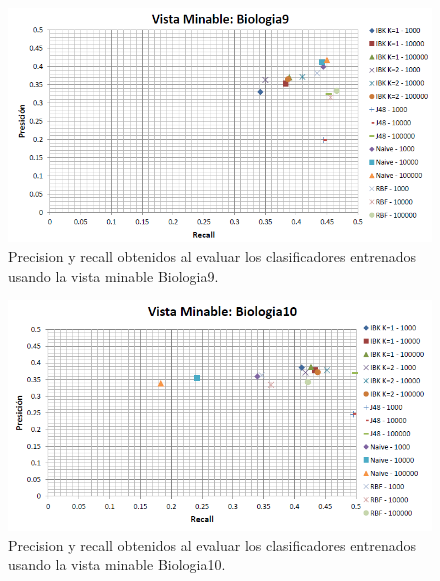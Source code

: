 \documentclass{article}
\begin{document}
\begin{figure}[!htb]
\begin{centering}
\includegraphics[scale=0.8]{biologia9}
\par\end{centering}
\caption{Precision y recall obtenidos al evaluar los clasificadores entrenados usando la vista minable Biologia9.}
\label{fig:figura2}
\end{figure}

\begin{figure}[!htb]
\begin{centering}
\includegraphics[scale=0.8]{biologia10}
\par\end{centering}
\caption{Precision y recall obtenidos al evaluar los clasificadores entrenados usando la vista minable Biologia10.}
\label{fig:figura3}
\end{figure}
\end{document}

